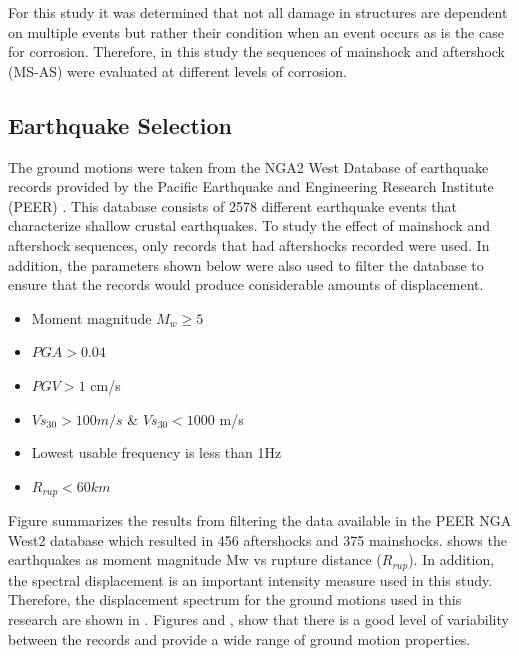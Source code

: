 For this study it was determined that not all damage in structures are dependent on multiple events but rather their condition when an event occurs as is the case for corrosion. Therefore, in this study the sequences of  mainshock and aftershock (MS-AS) were evaluated at different levels of corrosion.

\subsection{Earthquake Selection}

The ground motions were taken from the NGA2 West Database of earthquake records provided by the Pacific Earthquake and Engineering Research Institute (PEER) \cite{Ancheta2014}. This database consists of 2578 different earthquake events that characterize shallow crustal earthquakes. To study the effect of mainshock and aftershock sequences, only records that had aftershocks recorded were used. In addition, the parameters shown below were also used to filter the database to ensure that the records would produce considerable amounts of displacement.

\begin{itemize}
	\item Moment magnitude $M_w \geqslant 5$
	\item $PGA>0.04$
	\item $PGV>1$ cm/s
	\item $Vs_{30}>100m/s$ \& $Vs_{30}<1000$ m/s
	\item Lowest usable frequency is less than 1Hz
	\item $R_{rup}<60km$
\end{itemize}

Figure  summarizes the results from filtering the data available in the PEER NGA West2 database which resulted in 456 aftershocks and 375 mainshocks.  shows the earthquakes as moment magnitude {Mw} vs rupture distance ($R_{rup}$). In addition, the spectral displacement is an important intensity measure used in this study. Therefore, the displacement spectrum for the ground motions used in this research are shown in . Figures  and , show that there is a good level of variability between the records and provide a wide range of ground motion properties. 

